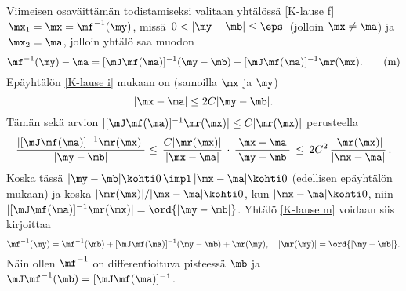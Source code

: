 Viimeisen osaväittämän todistamiseksi valitaan yhtälössä \eqref{K-lause f} 
$\,\mx_1=\mx=\mf^{-1}(\my)$, missä $\,0<|\my-\mb|\le\eps\,$ (jolloin $\mx\neq\ma$) ja
$\,\mx_2=\ma$, jolloin yhtälö saa muodon
\begin{equation} \label{K-lause m}
\mf^{-1}(\my)-\ma = [\mJ\mf(\ma)]^{-1}(\my-\mb)-[\mJ\mf(\ma)]^{-1}\mr(\mx). \tag{m}
\end{equation}
Epäyhtälön \eqref{K-lause i} mukaan on (samoilla $\mx$ ja $\my$)
\[
|\mx-\ma| \le 2C|\my-\mb|.
\]
Tämän sekä arvion $|[\mJ\mf(\ma)]^{-1}\mr(\mx)| \le C|\mr(\mx)|$ perusteella
\[
\frac{|[\mJ\mf(\ma)]^{-1}\mr(\mx)|}{|\my-\mb|} \le\,
\frac{C|\mr(\mx)|}{|\mx-\ma|}\,\cdot\,\frac{|\mx-\ma|}{|\my-\mb|}
\,\le\, 2C^2\,\frac{|\mr(\mx)|}{|\mx-\ma|}\,.
\]
Koska tässä $|\my-\mb| \kohti 0\,\impl\,|\mx-\ma| \kohti 0$ (edellisen epäyhtälön mukaan) ja
koska $|\mr(\mx)|/|\mx-\ma| \kohti 0$, kun $|\mx-\ma| \kohti 0$, niin
$|[\mJ\mf(\ma)]^{-1}\mr(\mx)|=\ord{|\my-\mb|}$. Yhtälö \eqref{K-lause m} voidaan siis
kirjoittaa
\[
\mf^{-1}(\my)=\mf^{-1}(\mb)+[\mJ\mf(\ma)]^{-1}(\my-\mb)+\mr(\my), \quad 
                                              |\mr(\my)|=\ord{|\my-\mb|}.
\]
Näin ollen $\mf^{-1}$ on differentioituva pisteessä $\mb$ ja 
$\mJ\mf^{-1}(\mb)=[\mJ\mf(\ma)]^{-1}$. \loppu

